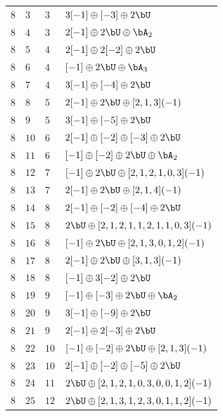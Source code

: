\begin{center}
\begin{longtable}{llll}
 \(8\) & \(3\) & \(3\) & \(3 [-1] \oplus [-3] \oplus 2 \bU\) \\
 \(8\) & \(4\) & \(3\) & \(2 [-1] \oplus 2 \bU \oplus \bA_{2}\) \\
 \(8\) & \(5\) & \(4\) & \(2 [-1] \oplus 2 [-2] \oplus 2 \bU\) \\
 \(8\) & \(6\) & \(4\) & \([-1] \oplus 2 \bU \oplus \bA_{3}\) \\
 \(8\) & \(7\) & \(4\) & \(3 [-1] \oplus [-4] \oplus 2 \bU\) \\
 \(8\) & \(8\) & \(5\) & \(2 [-1] \oplus 2 \bU \oplus [2, 1, 3](-1)\) \\
 \(8\) & \(9\) & \(5\) & \(3 [-1] \oplus [-5] \oplus 2 \bU\) \\
 \(8\) & \(10\) & \(6\) & \(2 [-1] \oplus [-2] \oplus [-3] \oplus 2 \bU\) \\
 \(8\) & \(11\) & \(6\) & \([-1] \oplus [-2] \oplus 2 \bU \oplus \bA_{2}\) \\
 \(8\) & \(12\) & \(7\) & \([-1] \oplus 2 \bU \oplus [2, 1, 2, 1, 0, 3](-1)\) \\
 \(8\) & \(13\) & \(7\) & \(2 [-1] \oplus 2 \bU \oplus [2, 1, 4](-1)\) \\
 \(8\) & \(14\) & \(8\) & \(2 [-1] \oplus [-2] \oplus [-4] \oplus 2 \bU\) \\
 \(8\) & \(15\) & \(8\) & \(2 \bU \oplus [2, 1, 2, 1, 1, 2, 1, 1, 0, 3](-1)\) \\
 \(8\) & \(16\) & \(8\) & \([-1] \oplus 2 \bU \oplus [2, 1, 3, 0, 1, 2](-1)\) \\
 \(8\) & \(17\) & \(8\) & \(2 [-1] \oplus 2 \bU \oplus [3, 1, 3](-1)\) \\
 \(8\) & \(18\) & \(8\) & \([-1] \oplus 3 [-2] \oplus 2 \bU\) \\
 \(8\) & \(19\) & \(9\) & \([-1] \oplus [-3] \oplus 2 \bU \oplus \bA_{2}\) \\
 \(8\) & \(20\) & \(9\) & \(3 [-1] \oplus [-9] \oplus 2 \bU\) \\
 \(8\) & \(21\) & \(9\) & \(2 [-1] \oplus 2 [-3] \oplus 2 \bU\) \\
 \(8\) & \(22\) & \(10\) & \([-1] \oplus [-2] \oplus 2 \bU \oplus [2, 1, 3](-1)\) \\
 \(8\) & \(23\) & \(10\) & \(2 [-1] \oplus [-2] \oplus [-5] \oplus 2 \bU\) \\
 \(8\) & \(24\) & \(11\) & \(2 \bU \oplus [2, 1, 2, 1, 0, 3, 0, 0, 1, 2](-1)\) \\
 \(8\) & \(25\) & \(12\) & \(2 \bU \oplus [2, 1, 3, 1, 2, 3, 0, 1, 1, 2](-1)\) \\

\end{longtable}
\end{center}
